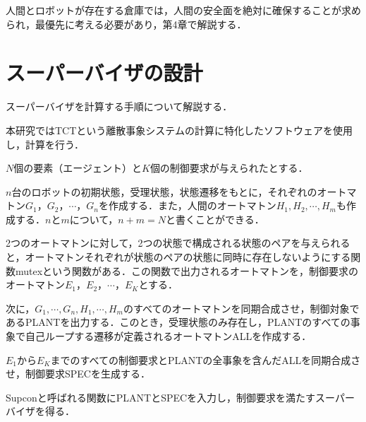 人間とロボットが存在する倉庫では，人間の安全面を絶対に確保することが求められ，最優先に考える必要があり，第4章で解説する．


\section{スーパーバイザの設計}\label{sec:design_sup}
スーパーバイザを計算する手順について解説する．

本研究ではTCTという離散事象システムの計算に特化したソフトウェアを使用し，計算を行う．

$N$個の要素（エージェント）と$K$個の制御要求が与えられたとする．

$n$台のロボットの初期状態，受理状態，状態遷移をもとに，それぞれのオートマトン$G_1，G_2，\cdots，G_n$を作成する．また，人間のオートマトン$H_1, H_2, \cdots, H_m$も作成する．$n$と$m$について，$n+m=N$と書くことができる．

2つのオートマトンに対して，2つの状態で構成される状態のペアを与えられると，オートマトンそれぞれが状態のペアの状態に同時に存在しないようにする関数mutexという関数がある．この関数で出力されるオートマトンを，制御要求のオートマトン$E_1，E_2，\cdots，E_K$とする．

次に，$G_1,\cdots,G_n,H_1,\cdots,H_m$のすべてのオートマトンを同期合成させ，制御対象であるPLANTを出力する．このとき，受理状態のみ存在し，PLANTのすべての事象で自己ループする遷移が定義されるオートマトンALLを作成する．

$E_1$から$E_K$までのすべての制御要求とPLANTの全事象を含んだALLを同期合成させ，制御要求SPECを生成する．

Supconと呼ばれる関数にPLANTとSPECを入力し，制御要求を満たすスーパーバイザを得る．

